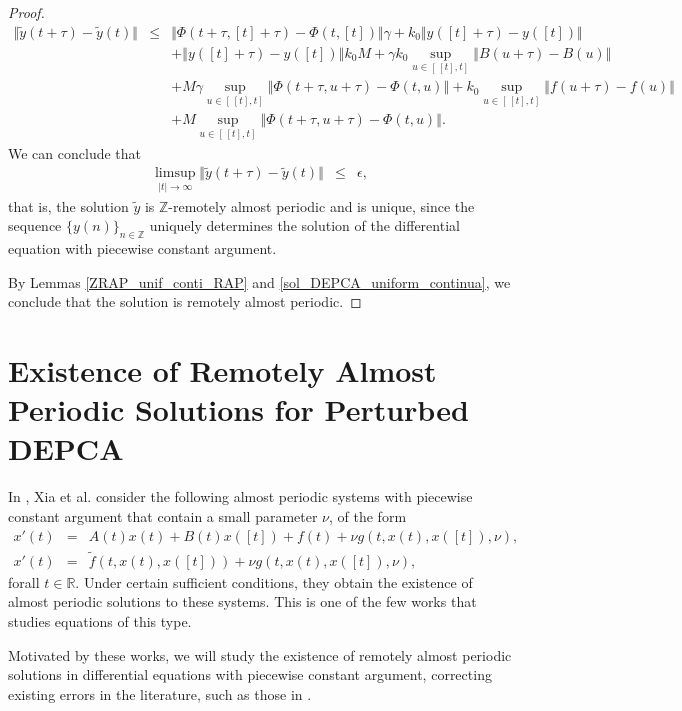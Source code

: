 \documentclass[english,,reqno]{amsart}
\numberwithin{equation}{section}
\theoremstyle{plain}
\theoremstyle{definition}
\theoremstyle{remark}
\begin{document}
\begin{proof}
\begin{eqnarray*}
\Vert \tilde{y}(t+\tau)-\tilde{y}(t) \Vert  &\leq& \Vert\Phi(t+\tau,[t]+\tau)-\Phi(t,[t])\Vert\gamma+k_{0}\Vert y([t]+\tau)-y([t])\Vert\\& &+\left\Vert y([t]+\tau)-y([t])\right\Vert k_{0}M+\gamma k_{0}\sup_{u\in[\,[t],t]}\left\Vert B(u+\tau)-B(u)\right\Vert \\
&&+M\gamma\sup_{u\in[\,[t],t]}\left\Vert \Phi(t+\tau,u+\tau)-\Phi(t,u)\right\Vert +k_{0}\sup_{u\in[\,[t],t]}\left\Vert f(u+\tau)-f(u)\right\Vert \\
&&+M\sup_{u\in[\,[t],t]}\left\Vert \Phi(t+\tau,u+\tau)-\Phi(t,u)\right\Vert .
\end{eqnarray*}
We can conclude that
\begin{eqnarray*}
\limsup_{\vert t\vert\rightarrow\infty}\Vert\tilde{y}(t+\tau)-\tilde{y}(t)\Vert&\leq&\epsilon,
\end{eqnarray*}
that is, the solution $\tilde{y}$ is $\mathbb{Z}$-remotely almost periodic and is unique,  
since the sequence $\{y(n)\}_{n \in \mathbb{Z}}$ uniquely determines the solution of the differential equation with piecewise constant argument.

By Lemmas \ref{ZRAP_unif_conti_RAP} and \ref{sol_DEPCA_uniform_continua}, we conclude that the solution is remotely almost periodic.
\end{proof}


\section{Existence of Remotely Almost Periodic Solutions for Perturbed DEPCA}\label{sec6}

In \cite{xia_3}, Xia et al. consider the following almost periodic systems with piecewise constant argument that contain a small parameter $\nu$, of the form  
\begin{eqnarray*}
x'(t) &=& A(t)x(t) + B(t)x([t]) + f(t) + \nu g(t, x(t), x([t]), \nu), \\
x'(t) &=& \tilde{f}(t, x(t), x([t])) + \nu g(t, x(t), x([t]), \nu),
\end{eqnarray*}  
forall $t\in\mathbb{R}$. Under certain sufficient conditions, they obtain the existence of almost periodic solutions to these systems.  
This is one of the few works that studies equations of this type.

Motivated by these works, we will study the existence of remotely almost periodic solutions in differential equations with piecewise constant argument,  
correcting existing errors in the literature, such as those in \cite{xia_3}.
\end{document}
